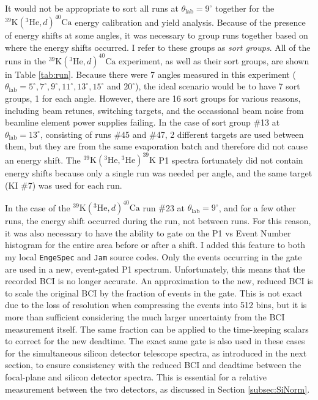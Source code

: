 It would not be appropriate to sort all runs at $\theta_{\mathrm{lab}} = 9^{\circ}$ together for the $^{39}\mathrm{K}(^{3}\mathrm{He},d)^{40}\mathrm{Ca}$ energy calibration and yield analysis. Because of the presence of energy shifts at some angles, it was necessary to group runs together based on where the energy shifts occurred. I refer to these groups as \emph{sort groups}. All of the runs in the $^{39}\mathrm{K}(^{3}\mathrm{He},d)^{40}\mathrm{Ca}$ experiment, as well as their sort groups, are shown in Table \ref{tab:run}. Because there were 7 angles measured in this experiment ($\theta_{\mathrm{lab}} = 5^{\circ}, 7^{\circ}, 9^{\circ}, 11^{\circ}, 13^{\circ}, 15^{\circ}$ and $20^{\circ}$), the ideal scenario would be to have 7 sort groups, 1 for each angle. However, there are 16 sort groups for various reasons, including beam retunes, switching targets, and the occassional beam noise from beamline element power supplies failing. In the case of sort group $\#$13 at $\theta_{\mathrm{lab}} = 13^{\circ}$, consisting of runs $\#$45 and $\#$47, 2 different targets are used between them, but they are from the same evaporation batch and therefore did not cause an energy shift. The $^{39}\mathrm{K}(^{3}\mathrm{He}, {}^{3}\mathrm{He})^{39}\mathrm{K}$ P1 spectra fortunately did not contain energy shifts because only a single run was needed per angle, and the same target (KI $\#$7) was used for each run.

In the case of the $^{39}\mathrm{K}(^{3}\mathrm{He},d)^{40}\mathrm{Ca}$ run $\#$23 at $\theta_{\mathrm{lab}} = 9^{\circ}$, and for a few other runs, the energy shift occurred during the run, not between runs. For this reason, it was also necessary to have the ability to gate on the P1 vs Event Number histogram for the entire area before or after a shift. I added this feature to both my local \texttt{EngeSpec} and \texttt{Jam} source codes. Only the events occurring in the gate are used in a new, event-gated P1 spectrum. Unfortunately, this means that the recorded BCI is no longer accurate. An approximation to the new, reduced BCI is to scale the original BCI by the fraction of events in the gate. This is not exact due to the loss of resolution when compressing the events into 512 bins, but it is more than sufficient considering the much larger uncertainty from the BCI measurement itself. The same fraction can be applied to the time-keeping scalars to correct for the new deadtime. The exact same gate is also used in these cases for the simultaneous silicon detector telescope spectra, as introduced in the next section, to ensure consistency with the reduced BCI and deadtime between the focal-plane and silicon detector spectra. This is essential for a relative measurement between the two detectors, as discussed in Section \ref{subsec:SiNorm}.

